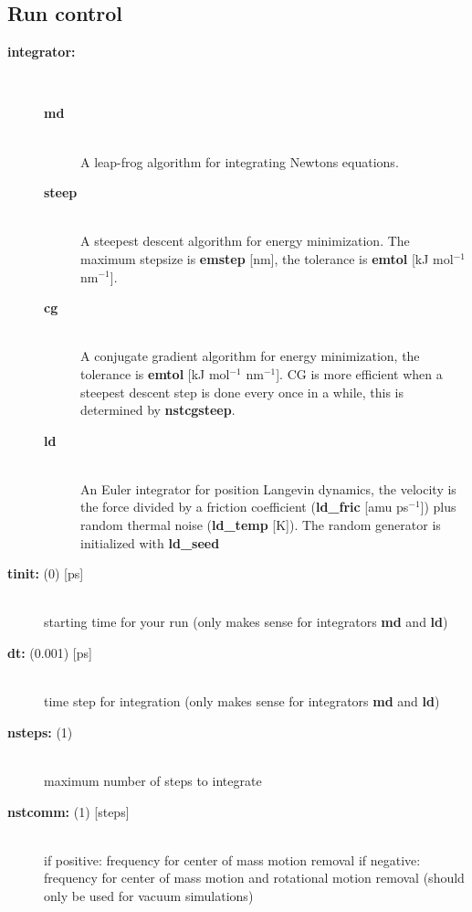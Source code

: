 \subsection{Run control}
\begin{description}
\item[{\bf integrator:}]\mbox{}\\
\vspace{-2ex}\begin{description}
\item[{\bf md} ]\mbox{}\\
A leap-frog algorithm for integrating Newtons equations.
\item[{\bf steep}]\mbox{}\\
A steepest descent algorithm for energy minimization.
The maximum stepsize is {\bf emstep} [nm], the tolerance is 
{\bf emtol} [kJ mol$^{-1}$ nm$^{-1}$].
\item[{\bf cg}]\mbox{}\\
 A conjugate gradient algorithm for energy minimization,
the tolerance is {\bf emtol} [kJ mol$^{-1}$ nm$^{-1}$]. 
CG is more efficient
when a steepest descent step is done every once in a while,
this is determined by {\bf nstcgsteep}.
\item[{\bf ld}]\mbox{}\\
 An Euler integrator for position Langevin dynamics, the
velocity is the force divided by a friction coefficient 
({\bf ld\_fric} [amu ps$^{-1}$])
plus random thermal noise ({\bf ld\_temp} [K]). 
The random generator is initialized with {\bf ld\_seed}
\end{description}
\item[{\bf tinit: }(0) {[ps]}]\mbox{}\\
starting time for your run (only makes sense for integrators {\bf md} 
and {\bf ld})
\item[{\bf dt: }(0.001) {[ps]}]\mbox{}\\
time step for integration (only makes sense for integrators {\bf md} 
and {\bf ld})
\item[{\bf nsteps: }(1)]\mbox{}\\
maximum number of steps to integrate
\item[{\bf nstcomm: }(1) {[steps]}]\mbox{}\\
if positive: frequency for center of mass motion removal
if negative: frequency for center of mass motion and rotational 
motion removal (should only be used for vacuum simulations)
\end{description}

